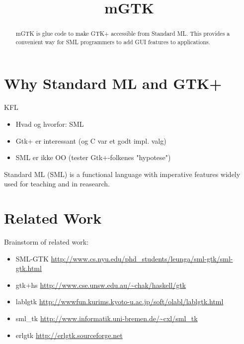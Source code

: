 \documentclass[workingdraft,endnotes]{usetex-v1}
\begin{document}
\title{mGTK}


\author{
\and
{}
%
} %

\maketitle

\begin{abstract}
  mGTK is glue code to make GTK+ accessible from Standard ML. This
  provides a convenient way for SML programmers to add GUI features to
  applications.
\end{abstract}


\section{Why Standard ML and GTK+}

\begin{ednote}{KFL}
  \begin{itemize}
  \item Hvad og hvorfor: SML  
  \item Gtk+ er interessant (og C var et godt
    impl. valg)  
  \item SML er ikke OO (tester Gtk+-folkenes "hypotese")
\end{itemize}
\end{ednote}

Standard ML (SML) is a functional language with imperative features
widely used for teaching and in reasearch. 



\section{Related Work}
\label{sec:related-work}

 Brainstorm of related work:
\begin{itemize}
\item SML-GTK 
\url{http://www.cs.nyu.edu/phd_students/leunga/sml-gtk/sml-gtk.html}

\item gtk+hs
\url{http://www.cse.unsw.edu.au/~chak/haskell/gtk}

\item lablgtk
\url{http://wwwfun.kurims.kyoto-u.ac.jp/soft/olabl/lablgtk.html}

\item sml\_tk
\url{http://www.informatik.uni-bremen.de/~cxl/sml_tk}

\item erlgtk
\url{http://erlgtk.sourceforge.net}

\end{itemize}
\end{document}
